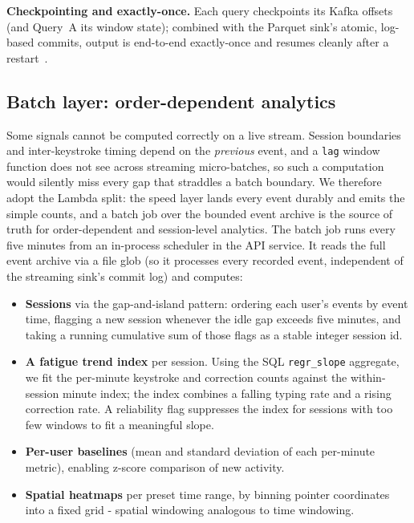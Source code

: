 \documentclass[conference]{IEEEtran}
\begin{document}
\textbf{Checkpointing and exactly-once.} Each query checkpoints its Kafka
offsets (and Query~A its window state); combined with the Parquet sink's
atomic, log-based commits, output is end-to-end exactly-once and resumes
cleanly after a restart~\cite{armbrust2018structured}.

\subsection{Batch layer: order-dependent analytics}
\label{sec:batch}
Some signals cannot be computed correctly on a live stream. Session
boundaries and inter-keystroke timing depend on the \emph{previous}
event, and a \texttt{lag} window function does not see across streaming
micro-batches, so such a computation would silently miss every gap that
straddles a batch boundary. We therefore adopt the Lambda split: the
speed layer lands every event durably and emits the simple counts, and a
batch job over the bounded event archive is the source of truth for
order-dependent and session-level analytics. The batch job runs every
five minutes from an in-process scheduler in the API service. It reads
the full event archive via a file glob (so it processes every recorded
event, independent of the streaming sink's commit log) and computes:

\begin{itemize}
  \item \textbf{Sessions} via the gap-and-island pattern: ordering each
        user's events by event time, flagging a new session whenever the
        idle gap exceeds five minutes, and taking a running cumulative
        sum of those flags as a stable integer session id.
  \item \textbf{A fatigue trend index} per session. Using the SQL
        \texttt{regr\_slope} aggregate, we fit the per-minute keystroke
        and correction counts against the within-session minute index;
        the index combines a falling typing rate and a rising correction
        rate. A reliability flag suppresses the index for sessions with
        too few windows to fit a meaningful slope.
  \item \textbf{Per-user baselines} (mean and standard deviation of each
        per-minute metric), enabling z-score comparison of new activity.
  \item \textbf{Spatial heatmaps} per preset time range, by binning
        pointer coordinates into a fixed grid - spatial windowing
        analogous to time windowing.
\end{itemize}
\end{document}

